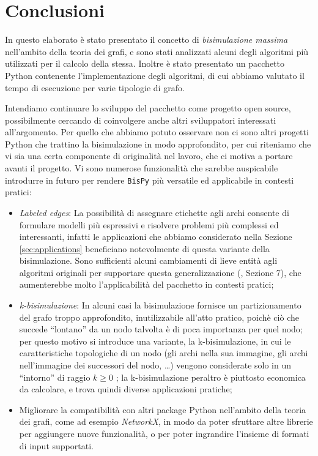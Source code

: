 \section{Conclusioni}
\label{sec:conclusions}
In questo elaborato è stato presentato il concetto di \emph{bisimulazione massima} nell'ambito della teoria dei grafi, e sono stati analizzati alcuni degli algoritmi più utilizzati per il calcolo della stessa. Inoltre è stato presentato un pacchetto Python contenente l'implementazione degli algoritmi, di cui abbiamo valutato il tempo di esecuzione per varie tipologie di grafo.

Intendiamo continuare lo sviluppo del pacchetto come progetto open source, possibilmente cercando di coinvolgere anche altri sviluppatori interessati all'argomento. Per quello che abbiamo potuto osservare non ci sono altri progetti Python che trattino la bisimulazione in modo approfondito, per cui riteniamo che vi sia una certa componente di originalità nel lavoro, che ci motiva a portare avanti il progetto. Vi sono numerose funzionalità che sarebbe auspicabile introdurre in futuro per rendere \texttt{BisPy} più versatile ed applicabile in contesti pratici:
\begin{itemize}
    \item \emph{Labeled edges}: La possibilità di assegnare etichette agli archi consente di formulare modelli più espressivi e risolvere problemi più complessi ed interessanti, infatti le applicazioni che abbiamo considerato nella Sezione \ref{sec:applications} beneficiano notevolmente di questa variante della bisimulazione. Sono sufficienti alcuni cambiamenti di lieve entità agli algoritmi originali per supportare questa generalizzazione (\cite{dovier}, Sezione 7), che aumenterebbe molto l'applicabilità del pacchetto in contesti pratici;
    \item \emph{k-bisimulazione}: In alcuni casi la bisimulazione fornisce un partizionamento del grafo troppo approfondito, inutilizzabile all'atto pratico, poichè ciò che succede ``lontano'' da un nodo talvolta è di poca importanza per quel nodo; per questo motivo si introduce una variante, la k-bisimulazione, in cui le caratteristiche topologiche di un nodo (gli archi nella sua immagine, gli archi nell'immagine dei successori del nodo, \dots) vengono considerate solo in un ``intorno'' di raggio $k \geq 0$ \cite{kbisi}; la k-bisimulazione peraltro è piuttosto economica da calcolare, e trova quindi diverse applicazioni pratiche;
    \item Migliorare la compatibilità con altri package Python nell'ambito della teoria dei grafi, come ad esempio \emph{NetworkX}, in modo da poter sfruttare altre librerie per aggiungere nuove funzionalità, o per poter ingrandire l'insieme di formati di input supportati.
\end{itemize}
